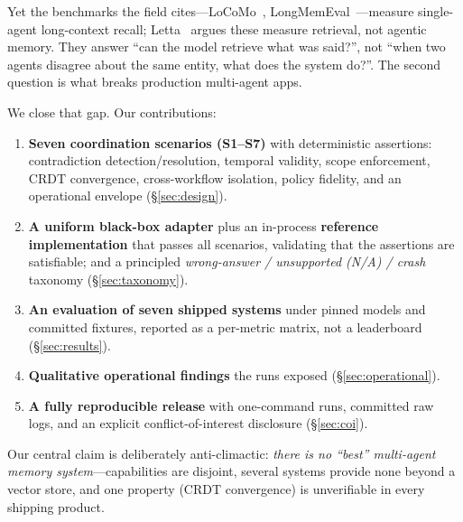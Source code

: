 \documentclass[11pt]{article}
\begin{document}
Yet the benchmarks the field cites---LoCoMo~\cite{maharana2024locomo},
LongMemEval~\cite{wu2025longmemeval}---measure single-agent long-context recall;
Letta~\cite{letta2025locomo} argues these measure retrieval, not agentic memory.
They answer ``can the model retrieve what was said?'', not ``when two agents disagree
about the same entity, what does the system do?''. The second question is what breaks
production multi-agent apps.

We close that gap. Our contributions:
\begin{enumerate}
  \item \textbf{Seven coordination scenarios (S1--S7)} with deterministic assertions:
  contradiction detection/resolution, temporal validity, scope enforcement, CRDT
  convergence, cross-workflow isolation, policy fidelity, and an operational envelope
  (\S\ref{sec:design}).
  \item \textbf{A uniform black-box adapter} plus an in-process \textbf{reference
  implementation} that passes all scenarios, validating that the assertions are
  satisfiable; and a principled \emph{wrong-answer / unsupported (N/A) / crash}
  taxonomy (\S\ref{sec:taxonomy}).
  \item \textbf{An evaluation of seven shipped systems} under pinned models and
  committed fixtures, reported as a per-metric matrix, not a leaderboard
  (\S\ref{sec:results}).
  \item \textbf{Qualitative operational findings} the runs exposed
  (\S\ref{sec:operational}).
  \item \textbf{A fully reproducible release} with one-command runs, committed raw
  logs, and an explicit conflict-of-interest disclosure (\S\ref{sec:coi}).
\end{enumerate}

Our central claim is deliberately anti-climactic: \emph{there is no ``best''
multi-agent memory system}---capabilities are disjoint, several systems provide none
beyond a vector store, and one property (CRDT convergence) is unverifiable in every
shipping product.
\end{document}
